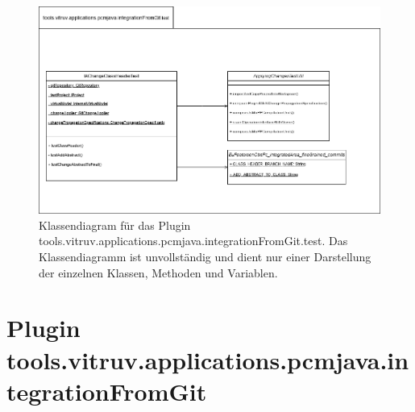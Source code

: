 \begin{figure}[h]
\includegraphics[width=\textwidth]{pictures/integrationFromGitTest_diagram.png}
\caption{Klassendiagram für das Plugin tools.vitruv.applications.pcmjava.integrationFromGit.test. Das Klassendiagramm ist unvollständig und dient nur einer Darstellung der einzelnen Klassen, Methoden und Variablen.}
\label{fig:integrationFromGit_test}
\end{figure}

\section{Plugin tools.vitruv.applications.pcmjava.integrationFromGit}

